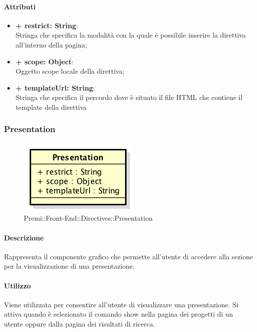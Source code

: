 	\paragraph{Attributi}
	\begin{itemize}
		\item \textbf{+ restrict: String}:\\
		Stringa che specifica la modalità con la quale è possibile inserire la direttiva all'interno della pagina;
		\item \textbf{+ scope: Object}:\\
		Oggetto scope locale della direttiva;
		\item \textbf{+ templateUrl: String}:\\
		Stringa che specifica il percordo dove è situato il file \gls{HTML} che contiene il \gls{template} della direttiva
	\end{itemize}
\newpage	
	

\subsubsection{Presentation}
	\begin{figure}[h]
		\centering
		\includegraphics[width=0.5\linewidth]{img/premi_front_end_directives_presentation}
		\caption[Premi::Front-End::Directives::Presentation]{Premi::Front-End::Directives::Presentation}
	\end{figure}
	
	\paragraph{Descrizione}
	Rappresenta il componente grafico che permette all'utente di accedere alla sezione per la visualizzazione di una presentazione.
	
	\paragraph{Utilizzo}
	Viene utilizzata per consentire all'utente di visualizzare una presentazione. Si attiva quando è selezionato il comando show nella pagina dei progetti di un utente oppure dalla pagina dei risultati di ricerca.
	
